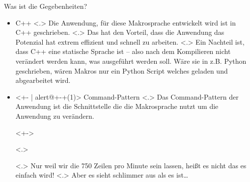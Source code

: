   \begin{frame}{Was ist die Gegebenheiten?}
    \begin{itemize}[<+- | alert@+>]
      \item
        C++
            \note[item]<.>{
              Die Anwendung, für diese Makrosprache entwickelt wird ist in C++ geschrieben.
            }
            \note[item]<.>{
              Das hat den Vorteil, dass die Anwendung das Potenzial hat extrem effizient und schnell zu arbeiten.
            }
            \note[item]<.>{
              Ein Nachteil ist, dass C++ eine statische Sprache ist -- also nach dem Kompilieren nicht verändert werden kann, was ausgeführt werden soll. Wäre sie in z.B. Python geschrieben, wären Makros nur ein Python Script welches geladen und abgearbeitet wird.
            }
      \item<+- | alert@+-+(1)>
        Command-Pattern%
            \note[item]<.>{
              Das Command-Pattern der Anwendung ist die Schnittstelle die die Makrosprache nutzt um die Anwendung zu verändern.
            }
        \begin{uncoverenv}<+->%
          \begin{uncoverenv}<.>%
          \end{uncoverenv}%
              \note[item]<.>{
                Nur weil wir die 750 Zeilen pro Minute sein lassen, heißt es nicht das es einfach wird!
              }
              \note[item]<.>{
                Aber es sieht schlimmer aus als es ist\ldots
              }
          \action{}
        \end{uncoverenv}

\end{itemize}
\end{frame}
